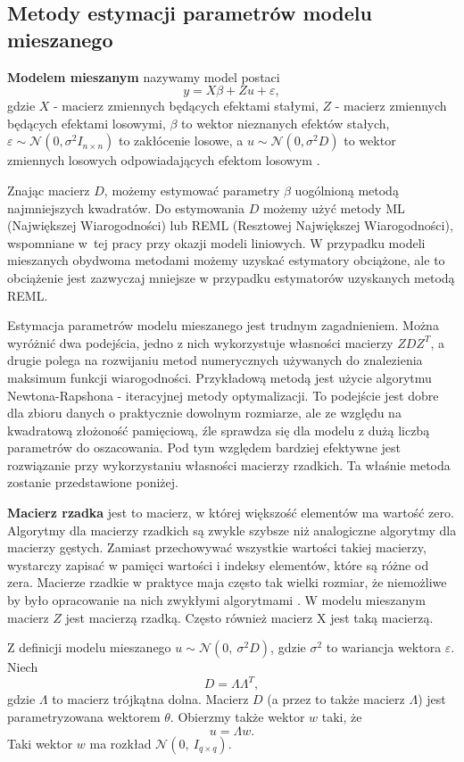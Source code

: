 \documentclass[12pt]{mwbk}
\theoremstyle{plain}
\theoremstyle{definition}
\theoremstyle{definition}
\begin{document}
\subsection{Metody estymacji parametrów modelu mieszanego}

\textbf{Modelem mieszanym} nazywamy model postaci
$$y=X\beta +Z u + \varepsilon,$$
gdzie $X$ - macierz zmiennych będących efektami stałymi, $Z$ - macierz zmiennych będących efektami losowymi, $\beta$ to wektor nieznanych efektów stałych, $\varepsilon \sim \mathcal{N}(0, \sigma^2 I_{n\times n})$ to zakłócenie losowe, a $u \sim \mathcal{N} (0, \sigma^2D)$ to wektor zmiennych losowych odpowiadających efektom losowym \cite{biecek}.

Znając macierz $D$, możemy estymować parametry $\beta$ uogólnioną metodą najmniejszych kwadratów. Do estymowania $D$ możemy użyć metody ML (Największej Wiarogodności) lub REML (Resztowej Największej Wiarogodności), wspomniane w~tej pracy przy okazji modeli liniowych. W przypadku modeli mieszanych obydwoma metodami możemy uzyskać estymatory obciążone, ale to obciążenie jest zazwyczaj mniejsze w przypadku estymatorów uzyskanych metodą REML.


Estymacja parametrów modelu mieszanego jest trudnym zagadnieniem. Można wyróżnić dwa podejścia, jedno z nich wykorzystuje własności macierzy $ZDZ^T$, a drugie polega na rozwijaniu metod numerycznych używanych do znalezienia maksimum funkcji wiarogodności. Przykładową metodą jest użycie algorytmu Newtona-Rapshona - iteracyjnej metody optymalizacji. To podejście jest dobre dla zbioru danych o praktycznie dowolnym rozmiarze, ale ze względu na kwadratową złożoność pamięciową, źle sprawdza się dla modelu z dużą liczbą parametrów do oszacowania. Pod tym względem bardziej efektywne jest rozwiązanie przy wykorzystaniu własności macierzy rzadkich. Ta właśnie metoda zostanie przedstawione poniżej.

\textbf{Macierz rzadka} jest to macierz, w której większość elementów ma wartość zero. Algorytmy dla macierzy rzadkich są zwykle szybsze niż analogiczne algorytmy dla macierzy gęstych. Zamiast przechowywać wszystkie wartości takiej macierzy, wystarczy zapisać w pamięci wartości i indeksy elementów, które są różne od zera. Macierze rzadkie w praktyce maja często tak wielki rozmiar, że niemożliwe by było opracowanie na nich zwykłymi algorytmami \cite{rzadka}. W modelu mieszanym macierz $Z$ jest macierzą rzadką. Często również macierz X jest taką macierzą.

Z definicji modelu mieszanego $u \sim \mathcal{N}(0,~\sigma^2D)$, gdzie $\sigma^2$ to wariancja wektora $\varepsilon$. Niech $$D=\Lambda \Lambda^T,$$ gdzie $\Lambda$ to macierz trójkątna dolna. Macierz $D$ (a przez to także macierz $\Lambda$) jest parametryzowana wektorem $\theta$. Obierzmy także wektor $w$ taki, że $$u=\Lambda w.$$ Taki wektor $w$ ma rozkład $\mathcal{N}(0,~I_{q \times q})$.
\end{document}
